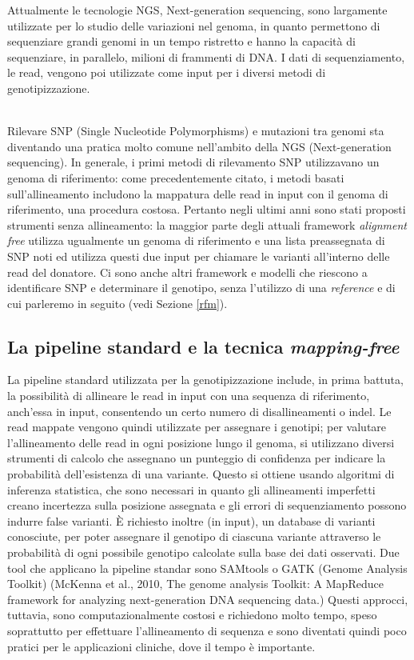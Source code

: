 \documentclass[../main.tex]{subfiles}
\begin{document}
Attualmente le tecnologie NGS, Next-generation sequencing, sono largamente utilizzate per lo studio delle variazioni nel genoma, in quanto permettono di sequenziare grandi genomi in un tempo ristretto e hanno la capacità di sequenziare, in parallelo, milioni di frammenti di DNA. I dati di sequenziamento, le read, vengono poi utilizzate come input per i diversi metodi di genotipizzazione.

\textcolor{OliveGreen}{\\ Rilevare SNP (Single Nucleotide Polymorphisms) e mutazioni tra genomi sta diventando una pratica molto comune nell'ambito della NGS (Next-generation sequencing). In generale, i primi metodi di rilevamento SNP utilizzavano un genoma di riferimento: come precedentemente citato, i metodi basati sull'allineamento includono la mappatura delle read in input con il genoma di riferimento, una procedura costosa. 
Pertanto negli ultimi anni sono stati proposti strumenti senza allineamento: la maggior parte degli attuali framework \textit{alignment free} utilizza ugualmente un genoma di riferimento e una lista preassegnata di SNP noti ed utilizza questi due input per chiamare le varianti all'interno delle read del donatore. Ci sono anche altri framework e modelli che riescono a identificare SNP e determinare il genotipo, senza l'utilizzo di una \textit{reference} e di cui parleremo in seguito (vedi Sezione \ref{rfm}).}


\subsection{La pipeline standard e la tecnica \textit{mapping-free}}


La pipeline standard utilizzata per la genotipizzazione include, in prima battuta, la possibilità di allineare le read in input con una sequenza di riferimento, anch'essa in input, consentendo un certo numero di disallineamenti o indel. Le read mappate vengono quindi utilizzate per assegnare i genotipi; per valutare l'allineamento delle read in ogni posizione lungo il genoma,  si utilizzano diversi strumenti di calcolo che assegnano un punteggio di confidenza per indicare la probabilità dell'esistenza di una variante. Questo si ottiene usando algoritmi di inferenza statistica, che sono necessari in quanto gli allineamenti imperfetti creano incertezza sulla posizione assegnata e gli errori di sequenziamento possono indurre false varianti. È richiesto inoltre \textcolor{OliveGreen}{(in input),} un database di varianti conosciute, per poter assegnare il genotipo di ciascuna variante attraverso le probabilità di ogni possibile genotipo calcolate sulla base dei dati osservati. Due tool che applicano la pipeline standar sono  SAMtools o GATK (Genome Analysis Toolkit) \textcolor{BurntOrange}{(McKenna et al., 2010, The genome analysis Toolkit: A MapReduce framework for analyzing next-generation DNA sequencing data.)} Questi approcci, tuttavia, sono computazionalmente costosi e richiedono molto tempo, speso soprattutto per effettuare l'allineamento di sequenza e sono diventati quindi poco pratici per le applicazioni cliniche, dove il tempo è importante. \\
\end{document}
